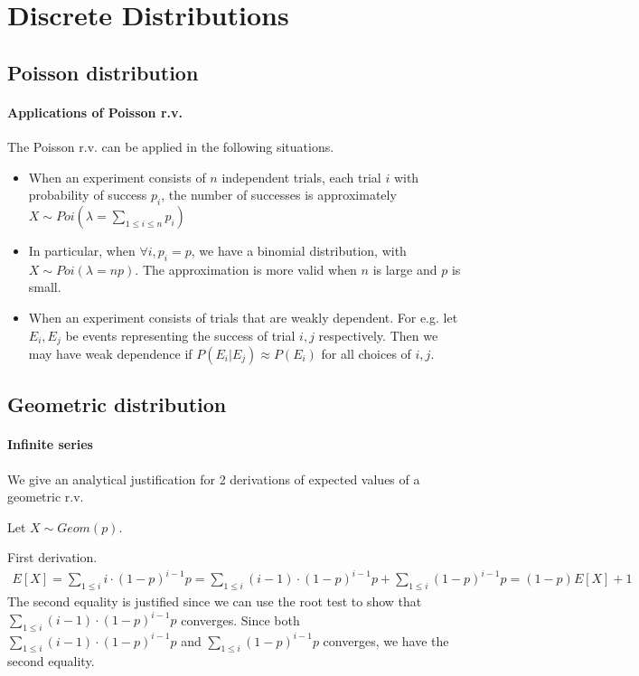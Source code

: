 \documentclass{article}
\begin{document}
\section{Discrete Distributions}
\subsection{Poisson distribution}
\paragraph{Applications of Poisson r.v.} The Poisson r.v. can be applied in the following situations.
\begin{itemize}
	\item When an experiment consists of $n$ independent trials, each trial $i$ with probability of success $p_i$, the number of successes is approximately $X\sim Poi(\lambda = \sum_{1\leq i\leq n} p_i)$
	\item In particular, when $\forall i, p_i = p$, we have a binomial distribution, with $X\sim Poi(\lambda = np)$. The approximation is more valid when $n$ is large and $p$ is small.
	\item When an experiment consists of trials that are weakly dependent. For e.g. let $E_i, E_j$ be events representing the success of trial $i, j$ respectively. Then we may have weak dependence if $P(E_i | E_j)\approx P(E_i)$ for all choices of $i, j$.
\end{itemize}

\subsection{Geometric distribution}
\paragraph{Infinite series} We give an analytical justification for 2 derivations of expected values of a geometric r.v.

Let $X\sim Geom(p)$.

First derivation.
\begin{align*}
	E[X] = \sum_{1\leq i}i\cdot (1-p)^{i-1}p = \sum_{1\leq i}(i-1)\cdot (1-p)^{i-1}p + \sum_{1\leq i}(1-p)^{i-1}p = (1-p)E[X] + 1
\end{align*}
The second equality is justified since we can use the root test to show that $\sum_{1\leq i}(i-1)\cdot (1-p)^{i-1}p$ converges. Since both $\sum_{1\leq i}(i-1)\cdot (1-p)^{i-1}p$ and $\sum_{1\leq i}(1-p)^{i-1}p$ converges, we have the second equality.
\end{document}
